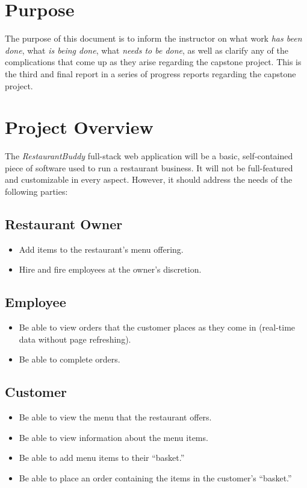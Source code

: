 \documentclass[letterpaper,11pt]{../../templates/texMemo}
\begin{document}
    \maketitle


    \section{Purpose}
    The purpose of this document is to inform the instructor on what work \textit{has been done}, what \textit{is being done}, what \textit{needs to be done}, as well as clarify any of the complications that come up as they arise regarding the capstone project. This is the third and final report in a series of progress reports regarding the capstone project.


    \section{Project Overview}
    The \textit{RestaurantBuddy} full-stack web application will be a basic, self-contained piece of software used to run a restaurant business. It will not be full-featured and customizable in every aspect. However, it should address the needs of the following parties:

    \subsection{Restaurant Owner}
    \begin{itemize}
        \item Add items to the restaurant's menu offering.
        \item Hire and fire employees at the owner's discretion.
    \end{itemize}

    \subsection{Employee}
    \begin{itemize}
        \item Be able to view orders that the customer places as they come in (real-time data without page refreshing).
        \item Be able to complete orders.
    \end{itemize}

    \subsection{Customer}
    \begin{itemize}
        \item Be able to view the menu that the restaurant offers.
        \item Be able to view information about the menu items.
        \item Be able to add menu items to their ``basket.''
        \item Be able to place an order containing the items in the customer's ``basket.''
    \end{itemize}
\end{document}
